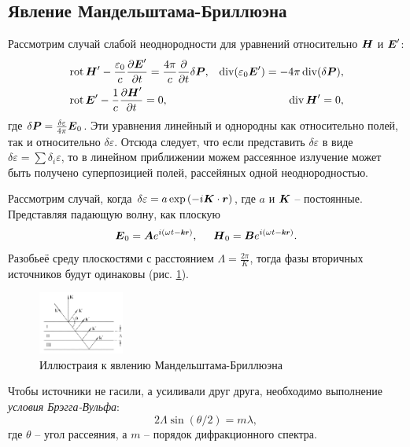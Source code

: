 \subsection{Явление Мандельштама-Бриллюэна}


Рассмотрим случай слабой неоднородности для уравнений относительно $\mbox{\boldmath $H$}$ и $\mbox{\boldmath $E$}'$:
\begin{align*}
    &\mathop{\mathrm{rot}}\nolimits \mbox{\boldmath $H$}' - \frac{\varepsilon_0}{c}\frac{\partial \mbox{\boldmath $E$}'}{\partial t} = \frac{4\pi}{c} \frac{\partial }{\partial t} \delta \mbox{\boldmath $P$},
    &\mathop{\mathrm{div}}\nolimits(\varepsilon_0 \mbox{\boldmath $E$}') = - 4 \pi \mathop{\mathrm{div}}\nolimits (\delta \mbox{\boldmath $P$}), \\
    &\mathop{\mathrm{rot}}\nolimits \mbox{\boldmath $E$}' - \frac{1}{c} \frac{\partial \mbox{\boldmath $H$}'}{\partial t} =0,
    &\mathop{\mathrm{div}}\nolimits \mbox{\boldmath $H$}' = 0,
\end{align*}
где $\delta \mbox{\boldmath $P$} = \frac{\delta \varepsilon}{4 \pi} \mbox{\boldmath $E$}_0$. 
Эти уравнения линейный и однородны как относительно полей, так и относительно $\delta \varepsilon$. Отсюда следует, что если представить $\delta \varepsilon$ в виде $\delta \varepsilon = \sum \delta_i \varepsilon$, то в линейном приближении можем рассеянное излучение может быть получено суперпозицией полей, рассейяных одной неоднородностью. 

Рассмотрим случай, когда $\delta \varepsilon = a \exp\left(-i \mbox{\boldmath $K$} \cdot \mbox{\boldmath $r$}\right)$, где $a$ и $\mbox{\boldmath $K$}$ -- постоянные. Представляя падающую волну, как плоскую
\begin{equation*}
    \vc{E}_0 = \vc{A} e^{i(\omega t - \smallvc{k} \smallvc{r})},
    \hspace{5 mm} 
    \vc{H}_0 = \vc{B} e^{i(\omega t -\smallvc{k} \smallvc{r})}.
\end{equation*}
Разобьеё среду плоскостями с расстоянием $\Lambda = \frac{2\pi}{K}$, тогда фазы вторичных источников будут одинаковы (рис. \ref{fig:ggg}). 
\begin{figure}[h]
    \centering
    \includegraphics[width=0.25\textwidth]{figures/ggg.png}
    \caption{Иллюстраия к явлению Мандельштама-Бриллюэна}
    \label{fig:ggg}
\end{figure}
Чтобы источники не гасили, а усиливали друг друга, необходимо выполнение \textit{условия Брэгга-Вульфа}:
\begin{equation*}
    2 \Lambda \sin(\theta/2) = m \lambda,
\end{equation*}
где $\theta$ -- угол рассеяния, а $m$ -- порядок дифракционного спектра. 

